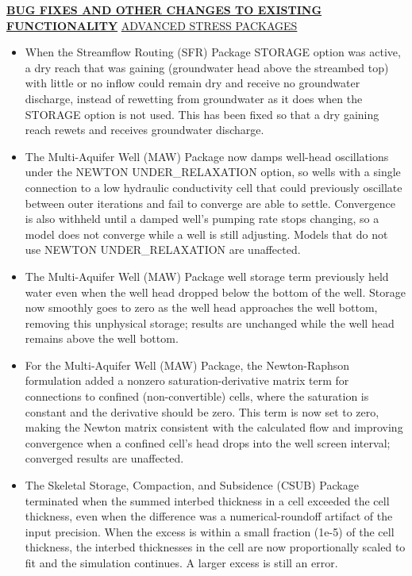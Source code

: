 \textbf{\underline{BUG FIXES AND OTHER CHANGES TO EXISTING FUNCTIONALITY}}
\underline{ADVANCED STRESS PACKAGES}
\begin{itemize}
\item When the Streamflow Routing (SFR) Package STORAGE option was active, a dry reach that was gaining (groundwater head above the streambed top) with little or no inflow could remain dry and receive no groundwater discharge, instead of rewetting from groundwater as it does when the STORAGE option is not used. This has been fixed so that a dry gaining reach rewets and receives groundwater discharge.
\item The Multi-Aquifer Well (MAW) Package now damps well-head oscillations under the NEWTON UNDER\_RELAXATION option, so wells with a single connection to a low hydraulic conductivity cell that could previously oscillate between outer iterations and fail to converge are able to settle. Convergence is also withheld until a damped well's pumping rate stops changing, so a model does not converge while a well is still adjusting. Models that do not use NEWTON UNDER\_RELAXATION are unaffected.
\item The Multi-Aquifer Well (MAW) Package well storage term previously held water even when the well head dropped below the bottom of the well. Storage now smoothly goes to zero as the well head approaches the well bottom, removing this unphysical storage; results are unchanged while the well head remains above the well bottom.
\item For the Multi-Aquifer Well (MAW) Package, the Newton-Raphson formulation added a nonzero saturation-derivative matrix term for connections to confined (non-convertible) cells, where the saturation is constant and the derivative should be zero. This term is now set to zero, making the Newton matrix consistent with the calculated flow and improving convergence when a confined cell's head drops into the well screen interval; converged results are unaffected.
\item The Skeletal Storage, Compaction, and Subsidence (CSUB) Package terminated when the summed interbed thickness in a cell exceeded the cell thickness, even when the difference was a numerical-roundoff artifact of the input precision. When the excess is within a small fraction (1e-5) of the cell thickness, the interbed thicknesses in the cell are now proportionally scaled to fit and the simulation continues. A larger excess is still an error.

\end{itemize}
